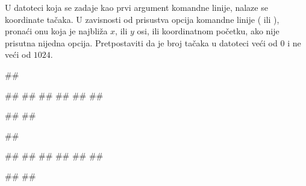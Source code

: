 \begin{Answer}[ref=3_04]
\end{Answer}
\begin{Exercise}[label=3_05]
  U datoteci koja se zadaje kao prvi argument komandne linije, nalaze
  se koordinate tačaka. U zavisnosti od prisustva opcija komandne
  linije ( ili ), pronaći onu koja je najbliža
  $x$, ili $y$ osi, ili koordinatnom početku, ako nije
  prisutna nijedna opcija. Pretpostaviti da je broj tačaka u datoteci
  veći od $0$ i ne veći od $1024$.
  
\begin{miditest}
\begin{test}{1}
##

##
##
##
##
##
##

#\naslovIzlaz#
##
\end{test}
\end{miditest}
\begin{miditest}
\begin{test}{2}
##
  
##
##
##
##
##
##

#\naslovIzlaz#
##
\end{test}
\end{miditest}
%
%  


\end{Exercise}

